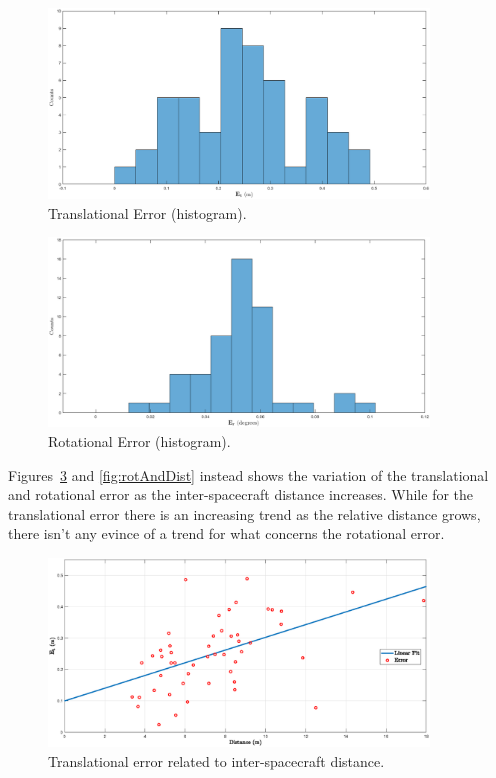\begin{figure}[htpb]
  \centering
  \includegraphics[width=0.9\textwidth]{gfx/plotError/transHist.eps}
  \caption{Translational Error (histogram).}
  \label{fig:translationalErrorHist}
\end{figure}

\begin{figure}[htpb]
  \centering
  \includegraphics[width=0.9\textwidth]{gfx/plotError/rotHist.eps}
  \caption{Rotational Error (histogram).}
  \label{fig:rotationalErrorHist}
\end{figure}

Figures~\ref{fig:transAndDist} and \ref{fig:rotAndDist} instead shows the variation of the translational and rotational error as the inter-spacecraft distance increases. While for the translational error there is an increasing trend as the relative distance grows, there isn't any evince of a trend for what concerns the rotational error.

\begin{figure}[htpb]
  \centering
  \includegraphics[width=0.9\textwidth]{gfx/plotError/transAndDist.eps}
  \caption{Translational error related to inter-spacecraft distance.}
  \label{fig:transAndDist}
\end{figure}

